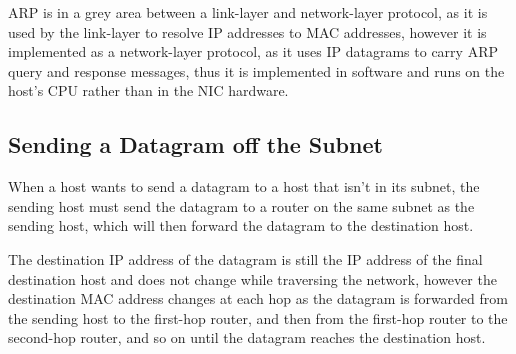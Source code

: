\documentclass[12pt letter]{report}
\begin{document}
ARP is in a grey area between a link-layer and network-layer
protocol, as it is used by the link-layer to resolve IP addresses to
MAC addresses, however it is implemented as a network-layer protocol,
as it uses IP datagrams to carry ARP query and response messages,
thus it is implemented in software and runs on the host's CPU rather
than in the NIC hardware.

\subsection{Sending a Datagram off the Subnet}


When a host wants to send a datagram to a host that isn't in its
subnet, the sending host must send the datagram to a router on the
same subnet as the sending host, which will then forward the datagram
to the destination host.

The destination IP address of the datagram is still the IP address of
the final destination host and does not change while traversing the
network, however the destination MAC address changes at each hop as
the datagram is forwarded from the sending host to the first-hop
router, and then from the first-hop router to the second-hop router,
and so on until the datagram reaches the destination host.
\end{document}
